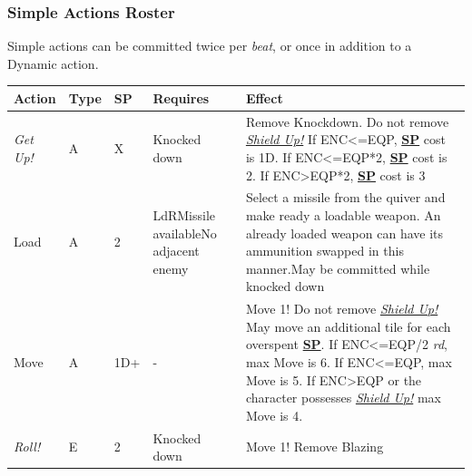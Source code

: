 \documentclass[12pt]{article}
\newcommand{\refto}[1]{\hyperlink{#1}{\textbf{#1}}}
\newcommand{\reftoit}[1]{\hyperlink{#1}{\emph{#1}}}
\begin{document}
\renewcommand{\arraystretch}{1.5}

\subsubsection{Simple Actions Roster}
Simple actions can be committed twice per \emph{beat}, or once in addition to a Dynamic action.\\

\begin{center}
\begin{tabularx}{\textwidth}{p{}p{}p{}p{}p{}}
\hline
\rowcolor{white} \textbf{Action} & \textbf{Type} & \textbf{SP} & \textbf{Requires} & \textbf{Effect}\setcounter{rownum}{0}\\
\hline
\emph{Get Up!} & A & X & Knocked down & Remove Knockdown.\newline
Do not remove \reftoit{Shield Up!}\newline
If ENC<=EQP, \refto{SP} cost is 1D.\newline
If ENC<=EQP*2, \refto{SP} cost is 2.\newline
If ENC>EQP*2, \refto{SP} cost is 3\\
Load & A & 2 & LdR\newline Missile available\newline No adjacent enemy & Select a missile from the quiver and make ready a loadable weapon. An already loaded weapon can have its ammunition swapped in this manner.\newline May be committed while knocked down\\
Move & A & 1D+ & - & Move 1!\newline
Do not remove \reftoit{Shield Up!}\newline
May move an additional tile for each overspent \refto{SP}.\newline
If ENC<=EQP/2 \emph{rd}, max Move is 6.\newline
If ENC<=EQP, max Move is 5.\newline
If ENC>EQP or the character possesses \reftoit{Shield Up!} max Move is 4.\setcounter{rownum}{0}\\
\rowcolor{white} \emph{Roll!} & E & 2 & Knocked down & Move 1!\newline
Remove Blazing\\
\hline
\end{tabularx}
\end{center}
\end{document}
